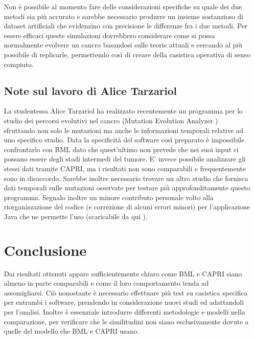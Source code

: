 \documentclass[a4paper]{article}
\begin{document}
	Non è possibile al momento fare delle considerazioni specifiche su quale dei due metodi sia più accurato e sarebbe necessario produrre un insieme
	sostanzioso di dataset artificiali che evidenzino con precisione le differenze fra i due metodi. Per essere efficaci queste simulazioni dovrebbero 
	considerare come si possa normalmente evolvere un cancro basandosi sulle teorie attuali e cercando al più possibile di replicarle, permettendo 
	così di creare della casistica operativa di senso compiuto.

	\subsection{\large Note sul lavoro di Alice Tarzariol}	
	
	La studentessa Alice Tarzariol ha realizzato recentemente un programma per lo studio dei percorsi evolutivi nel cancro (Mutation Evolution Analyzer \cite{Alice})
	sfruttando non solo le mutazioni ma anche le informazioni temporali relative ad uno specifico studio. 
	Data la specificità del software così preparato è impossibile confrontarlo con BML dato che quest'ultimo non 
	prevede che nei suoi input ci possano essere degli stadi intermedi del tumore. E' invece possibile analizzare gli 
	stessi dati tramite CAPRI, ma i risultati non sono comparabili e frequentemente sono in disaccordo. Sarebbe inoltre necessario 
	trovare un altro studio che fornisca dati temporali sulle mutazioni osservate per testare più approfonditamente questo programma.
	Segnalo inoltre un minore contributo personale volto alla riorganizzazione del codice (e correzione di alcuni errori minori) 
	per l'applicazione Java che ne permette l'uso (scaricabile da qui \cite{AliceNew}). 	
	  	 
	\section{\LARGE Conclusione}	

	Dai risultati ottenuti appare sufficientemente chiaro come BML e CAPRI siano almeno in parte comparabili e come il loro comportamento 
	tenda ad assomigliarsi. Ciò nonostante è necessario effettuare più test su casistica specifica per entrambi i software, 
	prendendo in considerazione nuovi studi ed adattandoli per l'analisi. Inoltre è essenziale introdurre differenti metodologie 
	e modelli nella comparazione, per verificare che le similitudini non siano esclusivamente dovute a quelle del modello 
	che BML e CAPRI usano. 
\end{document}
